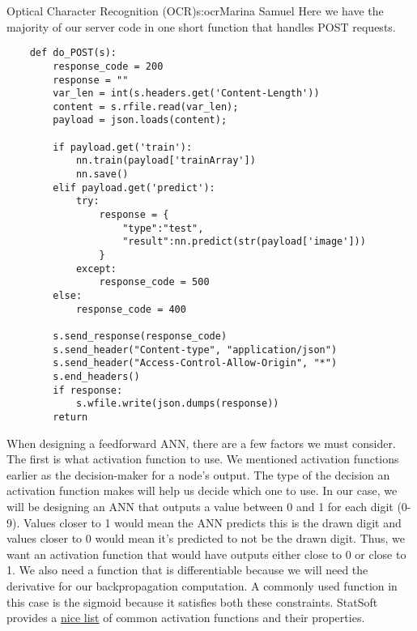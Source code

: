 \begin{aosachapter}{Optical Character Recognition (OCR)}{s:ocr}{Marina Samuel}
Here we have the majority of our server code in one short function that
handles POST requests.

\begin{verbatim}
    def do_POST(s):
        response_code = 200
        response = ""
        var_len = int(s.headers.get('Content-Length'))
        content = s.rfile.read(var_len);
        payload = json.loads(content);

        if payload.get('train'):
            nn.train(payload['trainArray'])
            nn.save()
        elif payload.get('predict'):
            try:
                response = {
                    "type":"test", 
                    "result":nn.predict(str(payload['image']))
                }
            except:
                response_code = 500
        else:
            response_code = 400

        s.send_response(response_code)
        s.send_header("Content-type", "application/json")
        s.send_header("Access-Control-Allow-Origin", "*")
        s.end_headers()
        if response:
            s.wfile.write(json.dumps(response))
        return
\end{verbatim}

\label{designing-a-feedforward-ann-neuralux5fnetworkux5fdesign.py}

\label{sec.ocr.feedforward}

When designing a feedforward ANN, there are a few factors we must
consider. The first is what activation function to use. We mentioned
activation functions earlier as the decision-maker for a node's output.
The type of the decision an activation function makes will help us
decide which one to use. In our case, we will be designing an ANN that
outputs a value between 0 and 1 for each digit (0-9). Values closer to 1
would mean the ANN predicts this is the drawn digit and values closer to
0 would mean it's predicted to not be the drawn digit. Thus, we want an
activation function that would have outputs either close to 0 or close
to 1. We also need a function that is differentiable because we will
need the derivative for our backpropagation computation. A commonly used
function in this case is the sigmoid because it satisfies both these
constraints. StatSoft provides a
\href{http://www.fmi.uni-sofia.bg/fmi/statist/education/textbook/eng/glosa.html}{nice
list} of common activation functions and their properties.


\end{aosachapter}
